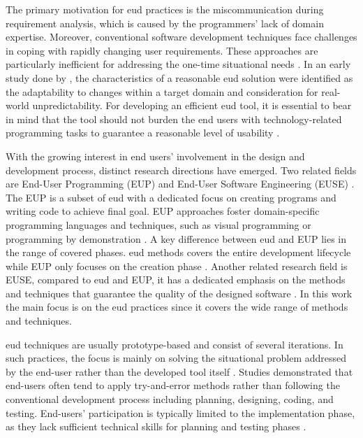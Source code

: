 The primary motivation for \gls{eud} practices is the miscommunication during requirement analysis, which is caused by the programmers' lack of domain expertise. Moreover, conventional software development techniques face challenges in coping with rapidly changing user requirements. These approaches are particularly inefficient for addressing the one-time situational needs \autocite{Paterno2013}. In an early study done by \autocite{Henderson1995}, the characteristics of a reasonable \gls{eud} solution were identified as the adaptability to changes within a target domain and consideration for real-world unpredictability. For developing an efficient \gls{eud} tool, it is essential to bear in mind that the tool should not burden the end users with technology-related programming tasks to guarantee a reasonable level of usability \autocite{Paterno2017a}.

With the growing interest in end users' involvement in the design and development process, distinct research directions have emerged. Two related fields are End-User Programming (EUP) and End-User Software Engineering (EUSE) \autocite{Barbosa2017}. The EUP is a subset of \gls{eud} with a dedicated focus on creating programs and writing code to achieve final goal. EUP approaches foster domain-specific programming languages and techniques, such as visual programming or programming by demonstration \autocite{Barricelli2019}. A key difference between \gls{eud} and EUP lies in the range of covered phases. \gls{eud} methods covers the entire development lifecycle while EUP only focuses on the creation phase \autocite{Santos2019}. Another related research field is EUSE, compared to \gls{eud} and EUP, it has a dedicated emphasis on the methods and techniques that guarantee the quality of the designed software \autocite{Barricelli2019}. In this work the main focus is on the \gls{eud} practices since it covers the wide range of methods and techniques.

\gls{eud} techniques are usually prototype-based and consist of several iterations. In such practices, the focus is mainly on solving the situational problem addressed by the end-user rather than the developed tool itself \autocite{Rosson2007}. Studies demonstrated that end-users often tend to apply try-and-error methods rather than following the conventional development process including planning, designing, coding, and testing. End-users' participation is typically limited to the implementation phase, as they lack sufficient technical skills for planning and testing phases \autocite{Tschudnowsky2016}.

